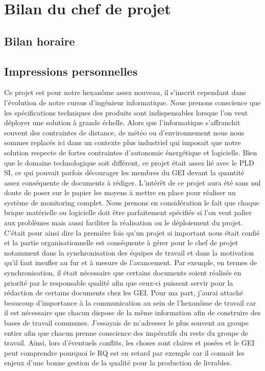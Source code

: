 \section{Bilan du chef de projet}
\subsection{Bilan horaire}
\subsection{Impressions personnelles}
Ce projet est pour notre hexanôme assez nouveau, il s'inscrit cependant dans l'évolution de notre cursus d'ingénieur informatique. Nous prenons conscience que les spécifications techniques des produits sont indispensables lorsque l'on veut déployer une solution à grande échelle. Alors que l'informatique s'affranchit souvent des contraintes de distance, de météo ou d'environnement nous nous sommes replacés ici dans un contexte plus industriel qui imposait que notre solution respecte de fortes contraintes d'autonomie énergétique et logicielle. Bien que le domaine technologique soit différent, ce projet était assez lié avec le PLD SI, ce qui pouvait parfois décourager les membres du GEI devant la quantité assez conséquente de documents à rédiger. L'intérêt de ce projet aura été sans nul doute de poser sur le papier les moyens à mettre en place pour réaliser un système de monitoring complet. Nous prenons en considération le fait que chaque brique matérielle ou logicielle doit être parfaitement spécifiée si l'on veut palier aux problèmes mais aussi faciliter la réalisation ou le déploiement du projet. C'était pour ainsi dire la première fois qu'un projet si important nous était confié et la partie organisationnelle est conséquente à gérer pour le chef de projet notamment dans la synchronisation des équipes de travail et dans la motivation qu'il faut insufler au fur et à mesure de l'avancement. Par exemple, en termes de synchronisation, il était nécessaire que certains documents soient réalisés en priorité par le responsable qualité afin que ceux-ci puissent servir pour la rédaction de certains documents chez les GEI. Pour ma part, j'aurai attaché beaucoup d'importance à la communication au sein de l'hexanôme de travail car il est nécessaire que chacun dispose de la même information afin de construire des bases de travail communes. J'essayais de m'adresser le plus souvent au groupe entier afin que chacun prenne conscience des impératifs du reste du groupe de travail. Ainsi, lors d'éventuels conflits, les choses sont claires et posées et le GEI peut comprendre pourquoi le RQ est en retard par exemple car il connait les enjeux d'une bonne gestion de la qualité pour la production de livrables.

